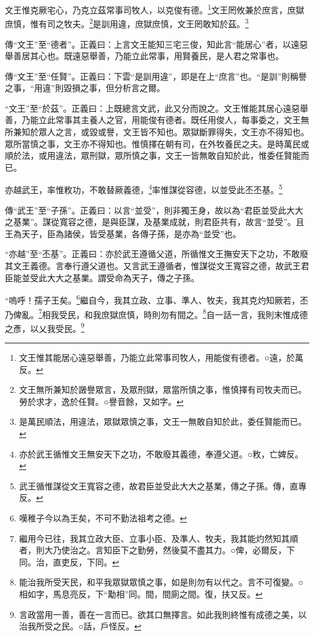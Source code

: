 文王惟克厥宅心，乃克立茲常事司牧人，以克俊有德。\footnote{文王惟其能居心遠惡舉善，乃能立此常事司牧人，用能俊有德者。○遠，於萬反。}文王罔攸兼於庶言，庶獄庶慎，惟有司之牧夫。\footnote{文王無所兼知於譭譽眾言，及眾刑獄，眾當所慎之事，惟慎擇有司牧夫而已。勞於求才，逸於任賢。○譽音餘，又如字。}是訓用違，庶獄庶慎，文王罔敢知於茲。\footnote{是萬民順法，用違法，眾獄眾慎之事，文王一無敢自知於此，委任賢能而已。}


{\noindent\zhuan{}\fzbyks 傳“文王”至“德者”。正義曰：上言文王能知三宅三俊，知此言“能居心”者，以遠惡舉善居其心也。既遠惡舉善，乃能立此常事，用賢養民，是人君之常事也。 \par}

{\noindent\zhuan{}\fzbyks 傳“文王”至“任賢”。正義曰：下雲“是訓用違”，即是在上“庶言”也。“是訓”則稱譽之事，“用違”則毀損之事，但分析言之爾。 \par}

{\noindent\shu{}\fzkt “文王”至“於茲”。正義曰：上既總言文武，此又分而說之。文王惟能其居心遠惡舉善，乃能立此常事其主養人之官，用能俊有德者。既任用俊人，每事委之，文王無所兼知於眾人之言，或毀或譽，文王皆不知也。眾獄斷罪得失，文王亦不得知也。眾所當慎之事，文王亦不得知也。惟慎擇在朝有司，在外牧養民之夫。是時萬民或順於法，或用違法，眾刑獄，眾所慎之事，文王一皆無敢自知於此，惟委任賢能而已。 \par}

亦越武王，率惟敉功，不敢替厥義德，\footnote{亦於武王循惟文王無安天下之功，不敢廢其義德，奉遵父道。○敉，亡婢反。}率惟謀從容德，以並受此丕丕基。\footnote{武王循惟謀從文王寬容之德，故君臣並受此大大之基業，傳之子孫。傳，直專反。}


{\noindent\zhuan{}\fzbyks 傳“武王”至“子孫”。正義曰：以言“並受”，則非獨王身，故以為“君臣並受此大大之基業”。謀從寬容之德，是與臣謀，及基業成就，則君臣共有，故言“並受”。且王為天子，臣為諸侯，皆受基業，各傳子孫，是亦為“並受”也。 \par}

{\noindent\shu{}\fzkt “亦越”至“丕基”。正義曰：亦於武王遵循父道，所循惟文王撫安天下之功，不敢廢其文王義德。言奉行遵父道也。又言武王遵循者，惟謀從文王寬容之德，故武王君臣能並受此大大之基業。謂受命為天子，傳之子孫。 \par}

“嗚呼！孺子王矣。\footnote{嘆稚子今以為王矣，不可不勤法祖考之德。}繼自今，我其立政、立事、準人、牧夫，我其克灼知厥若，丕乃俾亂。\footnote{繼用今已往，我其立政大臣、立事小臣、及準人、牧夫，我其能灼然知其順者，則大乃使治之。言知臣下之勤勞，然後莫不盡其力。○俾，必爾反，下同。治，直吏反，下同。}相我受民，和我庶獄庶慎，時則勿有間之。\footnote{能治我所受天民，和平我眾獄眾慎之事，如是則勿有以代之。言不可復變。○相如字，馬息亮反，下“勱相”同。間，間廁之間。復，扶又反。}自一話一言，我則末惟成德之彥，以乂我受民。\footnote{言政當用一善，善在一言而已。欲其口無擇言。如此我則終惟有成德之美，以治我所受之民。○話，戶怪反。}


